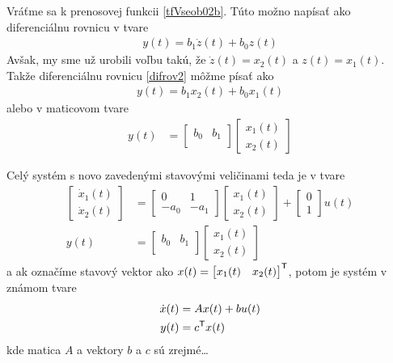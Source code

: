 \documentclass[a4paper, 10pt, ]{article}
\begin{document}
Vráťme sa k prenosovej funkcii \eqref{tfVseob02b}. Túto možno napísať ako diferenciálnu rovnicu v tvare
\begin{align} \label{difrov2}
    y(t) = b_1 \dot z(t) + b_0 z(t)
\end{align}
Avšak, my sme už urobili voľbu takú, že $\dot z(t) = x_2(t)$ a $z(t)= x_1(t)$. Takže diferenciálnu rovnicu \eqref{difrov2} môžme písať ako
\begin{align}
    y(t) = b_1 x_2(t) + b_0 x_1(t)
\end{align}
alebo v maticovom tvare
\begin{align}
	y(t)
	&=
	\begin{bmatrix}
    	b_0 & b_1 \\
  	\end{bmatrix}
    \begin{bmatrix}
    	  x_1(t) \\
		  x_2(t)
 	\end{bmatrix}
\end{align}

Celý systém s novo zavedenými stavovými veličinami teda je v tvare
\begin{align}
	\begin{bmatrix}
    	  \dot x_1(t) \\
		  \dot x_2(t)
 	\end{bmatrix}
	&=
	\begin{bmatrix}
    	0 & 1 \\
    	- a_0 & - a_1
  	\end{bmatrix}
    \begin{bmatrix}
    	  x_1(t) \\
		  x_2(t)
 	\end{bmatrix}
    +
    \begin{bmatrix}
    	  0 \\
		  1
 	\end{bmatrix}
    u(t)
    \\
    y(t)
    &=
    \begin{bmatrix}
        b_0 & b_1 \\
    \end{bmatrix}
    \begin{bmatrix}
          x_1(t) \\
          x_2(t)
    \end{bmatrix}
\end{align}
a ak označíme stavový vektor ako $x(t) = \begin{bmatrix} x_1(t) & x_2(t) \end{bmatrix}^{\mathsf{T}}$, potom je systém v známom tvare
\begin{subequations} \label{susDifRovnicPreODE}
    \begin{align}
    	\dot x(t) &= A x(t) + b u(t) \\
        y(t) &= c^{\mathsf{T}} x(t)
    \end{align}
\end{subequations}
kde matica $A$ a vektory $b$ a $c$ sú zrejmé\ldots
\end{document}
